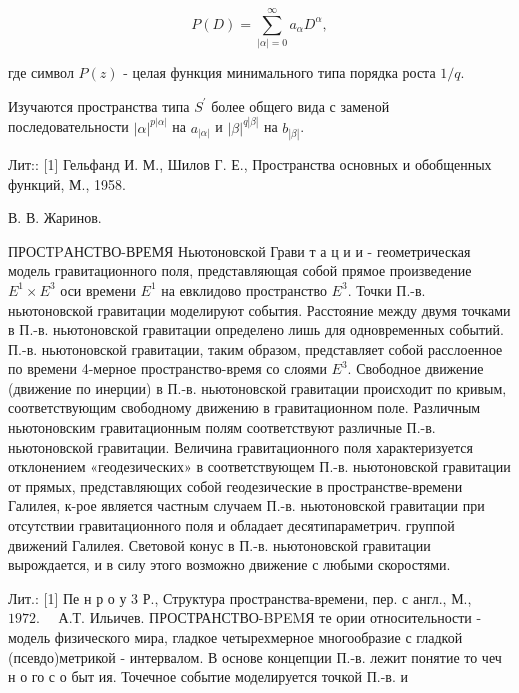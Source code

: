 \documentclass[10pt]{article}
\begin{document}
\[

P(D)=\sum_{|\alpha|=0}^{\infty} a_{\alpha} D^{\alpha},

\]



где символ $P(z)$ - целая функция минимального типа порядка роста $1 / q$.



Изучаются пространства типа $S^{\prime}$ более общего вида с заменой последовательности $|\alpha|^{p|\alpha|}$ на $a_{|\alpha|}$ и $|\beta|^{q|\beta|}$ на $b_{|\beta|}$.



Лит:: [1] Гельфанд И. М., Шилов Г. Е., Пространства основных и обобщенных функций, М., 1958.



В. В. Жаринов.



ПРОСТPАНСТВО-ВРЕМЯ Ньютоновской Грави т а ц и и - геометрическая модель гравитационного поля, представляющая собой прямое произведение $E^{1} \times E^{3}$ оси времени $E^{1}$ на евклидово пространство $E^{3}$. Точки П.-в. ньютоновской гравитации моделируют события. Расстояние между двумя точками в П.-в. ньютоновской гравитации определено лишь для одновременных событий. П.-в. ньютоновской гравитации, таким образом, представляет собой расслоенное по времени 4-мерное пространство-время со слоями $E^{3}$. Свободное движение (движение по инерции) в П.-в. ньютоновской гравитации происходит по кривым, соответствующим свободному движению в гравитационном поле. Различным ньютоновским гравитационным полям соответствуют различные П.-в. ньютоновской гравитации. Величина гравитационного поля характеризуется отклонением «геодезических» в соответствующем П.-в. ньютоновской гравитации от прямых, представляющих собой геодезические в пространстве-времени Галилея, к-рое является частным случаем П.-в. ньютоновской гравитации при отсутствии гравитационного поля и обладает десятипараметрич. группой движений Галилея. Световой конус в П.-в. ньютоновской гравитации вырождается, и в силу этого возможно движение с любыми скоростями.



Лит.: [1] Пе н р о у 3 Р., Структура пространства-времени, пер. с англ., М., $1972 . \quad$ А.Т. Ильичев. ПРОСТРАНСТВО-BPEMЯ те ории относительности - модель физического мира, гладкое четырехмерное многообразие с гладкой (псевдо)метрикой - интервалом. В основе концепции П.-в. лежит понятие то чеч н о го с о быт ия. Точечное событие моделируется точкой П.-в. и
\end{document}
